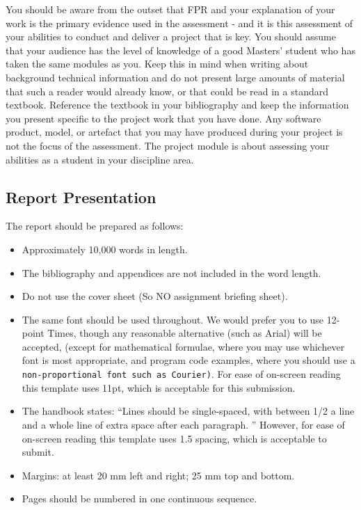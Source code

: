 \documentclass[a4paper, notitlepage, 11pt]{article}
\begin{document}
You should be aware from the outset that FPR and your explanation of your work is the primary evidence  used  in  the  assessment  -  and  it  is  this  assessment  of  your  abilities  to  conduct  and deliver a project that is key. You should assume that your audience has the level of knowledge of a good Masters' student who has taken the same modules as you. Keep this in mind when writing about background technical information and do not present large amounts of material that such a reader would already know, or that could be read in a standard textbook. Reference the textbook in your bibliography and keep the information you present specific to the project work that you have done. Any software product, model, or artefact that you may have produced during your project is not the focus of the assessment. The project module is about assessing your abilities as a student in your discipline area.  

\subsection{Report Presentation}
The report should be prepared as follows:  
\begin{itemize}
\item Approximately 10,000 words in length.
\item The bibliography and appendices are not included in the word length.  
\item Do not use the cover sheet (So NO assignment briefing sheet).  
\item The same font should be used throughout. We would prefer you to use 12-point Times, 
though  any  reasonable  alternative  (such  as  Arial)  will  be  accepted,  (except  for 
mathematical  formulae,  where  you  may  use  whichever  font  is  most  appropriate,  and 
program  code  examples,  where  you  should  use  a  \texttt{non-proportional  font  such  as 
Courier)}.  For ease of on-screen reading this template uses 11pt, which is acceptable for this submission.
\item The handbook states: ``Lines should be single-spaced, with between 1/2 a line and a whole line of extra space after each paragraph. '' However, for ease of on-screen reading this template uses 1.5 spacing, which is acceptable to submit.
\item Margins: at least 20 mm left and right; 25 mm top and bottom.  
\item Pages should be numbered in one continuous sequence. 
\end{itemize}
\end{document}

